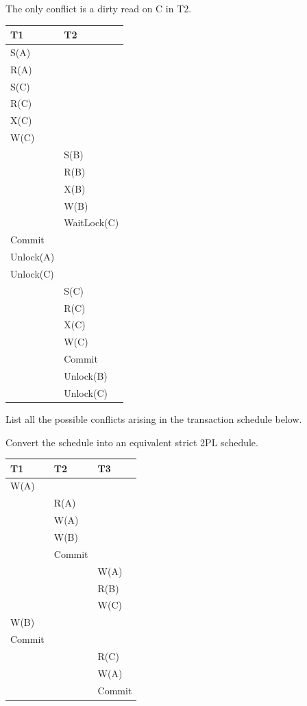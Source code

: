 \documentclass{beamer}
\begin{document}
\begin{slide}{
	\item The only conflict is a dirty read on C in T2.
	\begin{table}
		\tiny
		\begin{tabular}{l|l}
			T1 & T2\\
			\hline
			S(A) & \\
			R(A) & \\
			S(C) & \\
			R(C) & \\
			X(C) & \\
			W(C) & \\
			& S(B) \\
			& R(B) \\
			& X(B) \\
			& W(B) \\
			& WaitLock(C) \\
			Commit & \\
			Unlock(A) & \\
			Unlock(C) & \\
			& S(C) \\
			& R(C) \\
			& X(C) \\
		 	& W(C) \\
			& Commit \\
			& Unlock(B) \\
			& Unlock(C) \\	
		\end{tabular}
	\end{table}	
}\end{slide}

\begin{slide}{
	\item List all the possible conflicts arising in the transaction schedule below.
	\item Convert the schedule into an equivalent strict 2PL schedule.
	\begin{table}
		\tiny
		\begin{tabular}{l|l|l}
			T1 & T2 & T3\\
			\hline
			W(A) & & \\
			& R(A) & \\
			& W(A) & \\
			& W(B) & \\
			& Commit & \\
			& & W(A) \\
			& & R(B) \\
			& & W(C) \\
			W(B) & & \\
			Commit & & \\
			& & R(C) \\
			& & W(A) \\
			& & Commit\\	
		\end{tabular}
	\end{table}	
	
}\end{slide}
\end{document}
